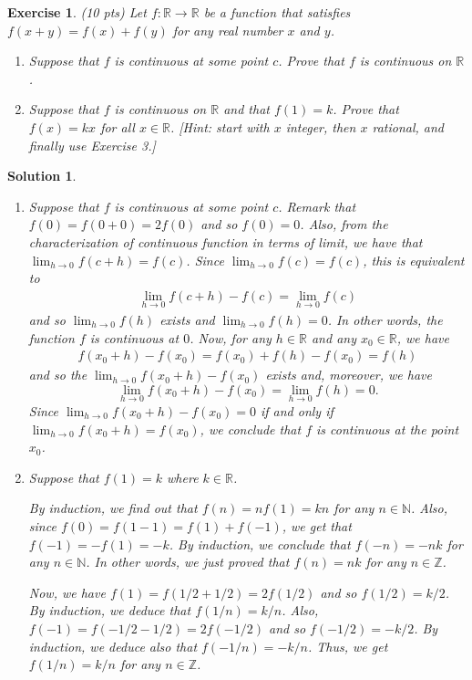 \documentclass[12pt]{article}
\newcommand{\bR}{\mathbb{R}}
\newcommand{\bN}{\mathbb{N}}
\newcommand{\bZ}{\mathbb{Z}}
\newcommand{\ra}{\rightarrow}
\theoremstyle{plain}
\newtheorem{exer}{\textbf{Exercise}}}
\theoremstyle{plain}
\newtheorem*{sol}{\textbf{Solution}}}
\theoremstyle{plain}
\theoremstyle{plain}
\begin{document}
\begin{exer}
(10 pts)
Let $f : \bR \ra \bR$ be a function that satisfies $f(x + y) = f(x) + f(y)$ for any real number $x$ and $y$.
	\begin{enumerate}[label=\textbf{\alph*)}]
	\item Suppose that $f$ is continuous at some point $c$. Prove that $f$ is continuous on $\bR$.
	\item Suppose that $f$ is continuous on $\bR$ and that $f(1) = k$. Prove that $f(x) = kx$ for all $x \in \bR$. [Hint: start with $x$ integer, then $x$ rational, and finally use Exercise 3.]
	\end{enumerate}
\end{exer}
\begin{sol}
\begin{enumerate}[label=\textbf{\alph*)}]
\item Suppose that $f$ is continuous at some point $c$. Remark that $f(0) = f(0 + 0) = 2 f(0)$ and so $f(0) = 0$. Also, from the characterization of continuous function in terms of limit, we have that $\lim_{h \ra 0} f(c + h) = f(c)$. Since $\lim_{h \ra 0} f(c) = f(c)$, this is equivalent to
	\begin{align*}
	\lim_{h \ra 0} f(c + h) - f(c) = \lim_{h \ra 0} f(c)
	\end{align*}
and so $\lim_{h \ra 0} f(h)$ exists and $\lim_{h \ra 0} f(h) = 0$. In other words, the function $f$ is continuous at $0$. Now, for any $h \in \bR$ and any $x_0 \in \bR$, we have
	\begin{align*}
	f(x_0 + h) - f(x_0) = f(x_0) + f(h) - f(x_0) = f(h)
	\end{align*}
and so the $\lim_{h \ra 0} f(x_0 + h) - f(x_0)$ exists and, moreover, we have
	$$
	\lim_{h \ra 0} f(x_0 + h) - f(x_0) = \lim_{h \ra 0} f(h) = 0.
	$$
Since $\lim_{h \ra 0} f(x_0 + h) - f(x_0) = 0$ if and only if $\lim_{h \ra 0} f(x_0 + h) = f(x_0)$, we conclude that $f$ is continuous at the point $x_0$.
\item Suppose that $f(1) = k$ where $k \in \bR$. 

By induction, we find out that $f(n) = n f(1) = kn$ for any $n \in \bN$. Also, since $f(0) = f(1 - 1) = f(1) + f(-1)$, we get that $f(-1) = -f(1) = -k$. By induction, we conclude that $f(-n) = -n k$ for any $n \in \bN$. In other words, we just proved that $f(n) = nk$ for any $n \in \bZ$.

Now, we have $f(1) = f(1/2 + 1/2) = 2 f(1/2)$ and so $f(1/2) = k/2$. By induction, we deduce that $f(1/n) = k/n$. Also, $f(-1) = f(-1/2 - 1/2) = 2 f(-1/2)$ and so $f(-1/2) = -k/2$. By induction, we deduce also that $f(-1/n) = -k/n$. Thus, we get $f(1/n) = k/n$ for any $n \in \bZ$. 


\end{enumerate}
\end{sol}
\end{document}
